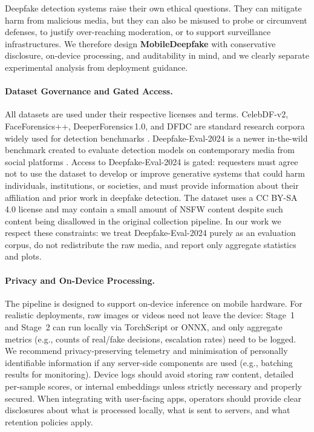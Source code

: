 Deepfake detection systems raise their own ethical questions. They can mitigate harm from malicious media, but they can also be misused to probe or circumvent defenses, to justify over\hyp reaching moderation, or to support surveillance infrastructures. We therefore design \textbf{MobileDeepfake} with conservative disclosure, on\hyp device processing, and auditability in mind, and we clearly separate experimental analysis from deployment guidance.

\paragraph{Dataset Governance and Gated Access.} All datasets are used under their respective licenses and terms. CelebDF\hyp v2, FaceForensics++, DeeperForensics\,1.0, and DFDC are standard research corpora widely used for detection benchmarks \cite{rossler2019faceforensicspp,li2020celebdf,dolhansky2020dfdc,jiang2020deeperforensics,verdoliva2020forensics_survey}. Deepfake\hyp Eval\hyp 2024 is a newer in\hyp the\hyp wild benchmark created to evaluate detection models on contemporary media from social platforms \cite{deepeval2024}. Access to Deepfake\hyp Eval\hyp 2024 is gated: requesters must agree not to use the dataset to develop or improve generative systems that could harm individuals, institutions, or societies, and must provide information about their affiliation and prior work in deepfake detection. The dataset uses a CC BY\hyp SA 4.0 license and may contain a small amount of NSFW content despite such content being disallowed in the original collection pipeline. In our work we respect these constraints: we treat Deepfake\hyp Eval\hyp 2024 purely as an evaluation corpus, do not redistribute the raw media, and report only aggregate statistics and plots.

\paragraph{Privacy and On-Device Processing.} The pipeline is designed to support on\hyp device inference on mobile hardware. For realistic deployments, raw images or videos need not leave the device: Stage~1 and Stage~2 can run locally via TorchScript or ONNX, and only aggregate metrics (e.g., counts of real/fake decisions, escalation rates) need to be logged. We recommend privacy\hyp preserving telemetry and minimisation of personally identifiable information if any server\hyp side components are used (e.g., batching results for monitoring). Device logs should avoid storing raw content, detailed per\hyp sample scores, or internal embeddings unless strictly necessary and properly secured. When integrating with user\hyp facing apps, operators should provide clear disclosures about what is processed locally, what is sent to servers, and what retention policies apply.

